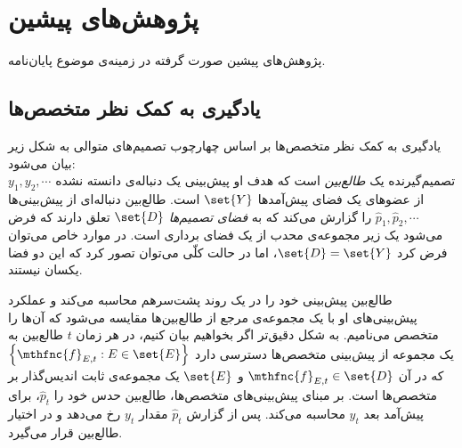 

\section{
پژوهش‌های پیشین
}

پژوهش‌های پیشین صورت گرفته در زمینه‌ی موضوع پایان‌نامه.




\subsection{
یادگیری به کمک نظر متخصص‌ها
\cite{predictionlearninggames2006}
}
یادگیری به کمک نظر متخصص‌ها
بر اساس چهارچوب تصمیم‌های متوالی
به شکل زیر بیان می‌شود:\\
تصمیم‌گیرنده یک 
\textit{
طالع‌بین
} 
است که هدف او پیش‌بینی یک دنباله‌ی دانسته نشده 
$y_1, y_2, \cdots$ 
از عضوهای یک فضای پیش‌آمدها 
$\set{Y}$
است. طالع‌بین دنباله‌ای از پیش‌بینی‌ها
$\hat{p}_1, \hat{p}_2, \cdots$ 
را گزارش می‌کند که به 
\textit{
فضای تصمیم‌ها
} 
$\set{D}$ 
تعلق دارند که فرض می‌شود یک زیر مجموعه‌ی محدب از یک فضای برداری است. در موارد خاص می‌توان فرض کرد 
$\set{D} = \set{Y}$، 
اما در حالت کلّی می‌توان تصور کرد که این دو فضا یکسان نیستند.


طالع‌بین پیش‌بینی خود را در یک روند پشت‌سرهم محاسبه می‌کند و عملکرد پیش‌بینی‌های او با یک مجموعه‌ی مرجع از طالع‌بین‌ها مقایسه می‌شود که آن‌ها را متخصص می‌نامیم. به شکل دقیق‌تر اگر بخواهیم بیان کنیم، در هر زمان 
$t$ 
طالع‌بین به یک مجموعه از پیش‌بینی متخصص‌ها دسترسی دارد 
$\left\lbrace \mthfnc{f}_{E,t} : E \in \set{E} \right\rbrace$ 
که در آن 
$\mthfnc{f}_{E,t} \in \set{D}$ 
و 
$\set{E}$ 
یک مجموعه‌ی ثابت اندیس‌گذار بر متخصص‌ها است. بر مبنای پیش‌بینی‌های متخصص‌ها، طالع‌بین حدس خود را 
$\hat{p}_t$، 
برای پیش‌آمد بعد 
$y_t$ 
محاسبه می‌کند. پس از گزارش 
$\hat{p}_t$ 
مقدار 
$y_t$ 
رخ می‌دهد و در اختیار طالع‌بین قرار می‌گیرد.

